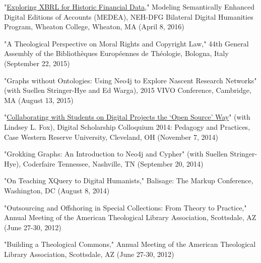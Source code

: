 \documentclass[10pt]{res} %
\begin{document}
\begin{resume}
\begin{hangparas}{.25in}{1}"\href{http://medea.hypotheses.org/497}{Exploring XBRL for Historic Financial Data}," Modeling Semantically Enhanced Digital Editions of Accounts (MEDEA), NEH-DFG Bilateral Digital Humanities Program, Wheaton College, Wheaton, MA (April 8, 2016)\end{hangparas}

\begin{hangparas}{.25in}{1}"A Theological Perspective on Moral Rights and Copyright Law," 44th General Assembly of the Bibliothèques Européennes de Théologie, Bologna, Italy (September 22, 2015)\end{hangparas}

\begin{hangparas}{.25in}{1}"Graphs without Ontologies: Using Neo4j to Explore Nascent Research Networks" (with Suellen Stringer-Hye and Ed Warga), 2015 VIVO Conference, Cambridge, MA (August 13, 2015)\end{hangparas}

\begin{hangparas}{.25in}{1}"\href{https://www.youtube.com/watch?v=-Hbg6r3JZAQ}{Collaborating with Students on Digital Projects the ‘Open Source’ Way}" (with Lindsey L. Fox), Digital Scholarship Colloquium 2014: Pedagogy and Practices, Case Western Reserve University, Cleveland, OH (November 7, 2014)\end{hangparas}

\begin{hangparas}{.25in}{1}"Grokking Graphs: An Introduction to Neo4j and Cypher" (with Suellen Stringer-Hye), Coderfaire Tennessee, Nashville, TN (September 20, 2014)\end{hangparas}

\begin{hangparas}{.25in}{1}"On Teaching XQuery to Digital Humanists," Balisage: The Markup Conference, Washington, DC (August 8, 2014)\end{hangparas}

\begin{hangparas}{.25in}{1}"Outsourcing and Offshoring in Special Collections: From Theory to Practice," Annual Meeting of the American Theological Library Association, Scottsdale, AZ (June 27-30, 2012)\end{hangparas}

\begin{hangparas}{.25in}{1}"Building a Theological Commons," Annual Meeting of the American Theological Library Association, Scottsdale, AZ (June 27-30, 2012)\end{hangparas}


\end{resume}
\end{document}
